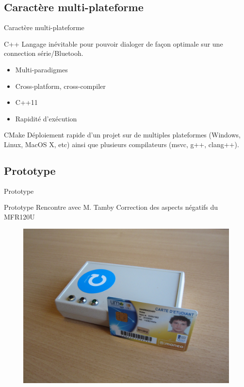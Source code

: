 \subsection{Caractère multi-plateforme}
\begin{frame}{Caractère multi-plateforme}
	\begin{block}{C++}
        Langage inévitable pour pouvoir dialoger de façon optimale sur une connection
        série/Bluetooh.

	    \begin{itemize}
            \item Multi-paradigmes
            \item Cross-platform, cross-compiler
            \item C++11
            \item Rapidité d'exécution
	    \end{itemize}
	\end{block}

	\begin{block}{CMake}
        Déploiement rapide d'un projet sur de multiples plateformes (Windows, Linux,
    MacOS X, etc) ainsi que plusieurs compilateurs (msvc, g++, clang++).
	\end{block}
\end{frame}


\subsection{Prototype}
\begin{frame}{Prototype}
	\begin{block}{Prototype}
        Rencontre avec M. Tamby
        Correction des aspects négatifs du MFR120U
	\end{block}

    \begin{figure}[h]
        \begin{center}
            \includegraphics[scale=0.4]{images/proto.jpg} 
        \end{center}
     \end{figure} 
\end{frame}

